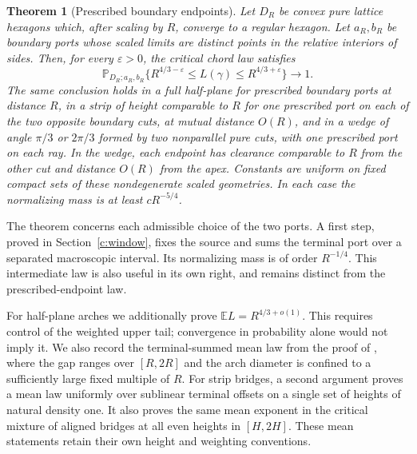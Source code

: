 \documentclass[11pt]{article}
\numberwithin{equation}{section}
\newtheorem{theorem}{Theorem}[section]
\theoremstyle{definition}\newtheorem{definition}[theorem]{Definition}
\theoremstyle{remark}\newtheorem{remark}[theorem]{Remark}
\begin{document}
\begin{theorem}[Prescribed boundary endpoints]\label{c:main}
Let $D_R$ be convex pure lattice hexagons which, after scaling by $R$,
converge to a regular hexagon. Let $a_R,b_R$ be boundary ports whose
scaled limits are distinct points in the relative interiors of sides.
Then, for every $\varepsilon>0$, the critical chord law satisfies
\[
 \mathbb P_{D_R;a_R,b_R}
 \{R^{4/3-\varepsilon}\le L(\gamma)\le R^{4/3+\varepsilon}\}
 \longrightarrow1.
\]
The same conclusion holds in a full half-plane for prescribed boundary
ports at distance $R$, in a strip of height comparable to $R$ for
one prescribed port on each of the two opposite boundary cuts, at mutual
distance $O(R)$, and in a wedge of angle
$\pi/3$ or $2\pi/3$ formed by two nonparallel pure cuts, with one prescribed port on each ray.
In the wedge, each endpoint has clearance comparable to $R$ from the other cut and
distance $O(R)$ from the apex. Constants are uniform on fixed compact
sets of these nondegenerate scaled geometries. In each case the
normalizing mass is at least $cR^{-5/4}$.
\end{theorem}

The theorem concerns each admissible choice of the two ports. A first
step, proved in Section~\ref{c:window}, fixes the source and sums the
terminal port over a separated macroscopic interval. Its normalizing
mass is of order $R^{-1/4}$. This intermediate law is also useful in its
own right, and remains distinct from the prescribed-endpoint law.

For half-plane arches we additionally prove
$\mathbb E L=R^{4/3+o(1)}$. This requires control of the weighted upper
tail; convergence in probability alone would not imply it. We also record
the terminal-summed mean law from the proof of \cite[Theorem 8.1]{Renewal},
where the gap ranges over $[R,2R]$ and the arch diameter is confined to a
sufficiently large fixed multiple of $R$. For strip
bridges, a second argument proves a mean law uniformly over sublinear
terminal offsets on a single set of heights of natural density one.
It also proves the same mean exponent in the critical mixture of aligned
bridges at all even heights in $[H,2H]$. These mean statements retain their
own height and weighting conventions.
\end{document}
